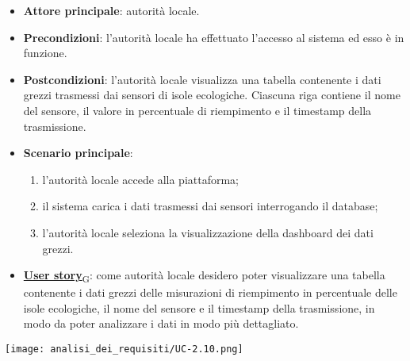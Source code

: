\begin{itemize}
	\item \textbf{Attore principale}: autorità locale.
	\item \textbf{Precondizioni}: l'autorità locale ha effettuato l'accesso al sistema ed esso è in funzione.
	\item \textbf{Postcondizioni}: l'autorità locale visualizza una tabella contenente i dati grezzi trasmessi dai sensori di isole ecologiche.
	      Ciascuna riga contiene il nome del sensore, il valore in percentuale di riempimento e il timestamp della trasmissione.
	\item \textbf{Scenario principale}:
	      \begin{enumerate}
		      \item l'autorità locale accede alla piattaforma;
		      \item il sistema carica i dati trasmessi dai sensori interrogando il database;
		      \item l'autorità locale seleziona la visualizzazione della dashboard dei dati grezzi.
	      \end{enumerate}
	\item \href{https://7last.github.io/docs/pb/documentazione-interna/glossario\#user-story}{\textbf{User story}\textsubscript{G}}:
	      come autorità locale desidero poter visualizzare una tabella contenente i dati grezzi delle misurazioni di riempimento in percentuale delle isole ecologiche,
	      il nome del sensore e il timestamp della trasmissione, in modo da poter analizzare i dati in modo più dettagliato.
\end{itemize}
\begin{center}
	\texttt{[image: analisi\_dei\_requisiti/UC-2.10.png]}
\end{center}


